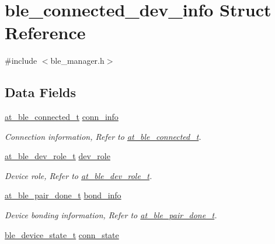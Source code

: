 \hypertarget{structble__connected__dev__info}{}\section{ble\+\_\+connected\+\_\+dev\+\_\+info Struct Reference}
\label{structble__connected__dev__info}


{\ttfamily \#include $<$ble\+\_\+manager.\+h$>$}

\subsection*{Data Fields}
\begin{DoxyCompactItemize}
\item 
\mbox{\hyperlink{structat__ble__connected__t}{at\+\_\+ble\+\_\+connected\+\_\+t}} \mbox{\hyperlink{structble__connected__dev__info_af980db94ada9d4ffb126d2ed39ece59f}{conn\+\_\+info}}
\begin{DoxyCompactList}\small\item\em Connection information, Refer to \mbox{\hyperlink{structat__ble__connected__t}{at\+\_\+ble\+\_\+connected\+\_\+t}}. \end{DoxyCompactList}\item 
\mbox{\hyperlink{at__ble__api_8h_ad15e38aadd54f5fc3ab8a75b35ae476a}{at\+\_\+ble\+\_\+dev\+\_\+role\+\_\+t}} \mbox{\hyperlink{structble__connected__dev__info_a43e61598480ee3f3e36813712de4dccb}{dev\+\_\+role}}
\begin{DoxyCompactList}\small\item\em Device role, Refer to \mbox{\hyperlink{at__ble__api_8h_ad15e38aadd54f5fc3ab8a75b35ae476a}{at\+\_\+ble\+\_\+dev\+\_\+role\+\_\+t}}. \end{DoxyCompactList}\item 
\mbox{\hyperlink{structat__ble__pair__done__t}{at\+\_\+ble\+\_\+pair\+\_\+done\+\_\+t}} \mbox{\hyperlink{structble__connected__dev__info_a57618d0b6b8d51f05746d330848ad96a}{bond\+\_\+info}}
\begin{DoxyCompactList}\small\item\em Device bonding information, Refer to \mbox{\hyperlink{structat__ble__pair__done__t}{at\+\_\+ble\+\_\+pair\+\_\+done\+\_\+t}}. \end{DoxyCompactList}\item 
\mbox{\hyperlink{ble__manager_8h_abcdab7066ca2dc0d328ed5e555cdcf7c}{ble\+\_\+device\+\_\+state\+\_\+t}} \mbox{\hyperlink{structble__connected__dev__info_abc9eba5b7bb5964e72e0b46c131dcb42}{conn\+\_\+state}}

\end{DoxyCompactItemize}
